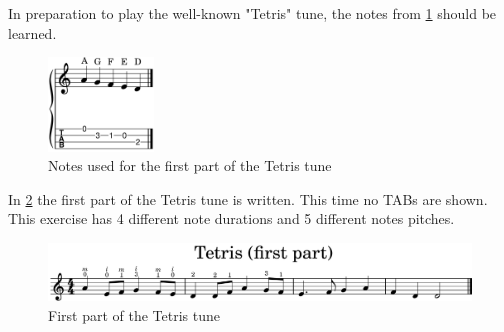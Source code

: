 In preparation to play the well-known "Tetris" tune, the notes from \ref{fig:ukulele_notes_for_tetris_first_part} should be learned.

\begin{figure}[h]
	\centering
	\includegraphics[width=0.25\textwidth]{../../MuseScore/Ukulele/UkuleleNotesUsedInTetrisFirstPart.png}
	\caption{Notes used for the first part of the Tetris tune}
	\label{fig:ukulele_notes_for_tetris_first_part}
\end{figure}

In \ref{fig:ukulele_tetris_simple_first_part} the first part of the Tetris tune is written. This time no TABs are shown. This exercise has 4 different note durations and 5 different notes pitches.

\begin{figure}[h]
	\centering
	\includegraphics[width=\textwidth]{../../MuseScore/Ukulele/UkuleleTetrisSimpleFirstPart.png}
	\caption{First part of the Tetris tune}
	\label{fig:ukulele_tetris_simple_first_part}
\end{figure}


